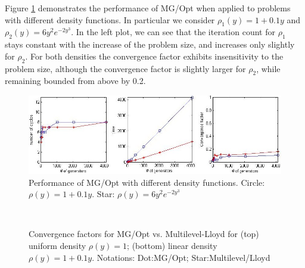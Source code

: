 \documentclass{siamltex}
\begin{document}
Figure \ref{fig:g_difnon} demonstrates the performance of MG/Opt when applied to problems with different density functions.  In particular we consider $\rho_1(y)=1+0.1y$ and $\rho_2(y)=6y^{2}e^{-2y^{3}}$.  In the left plot, we can see that the iteration count for $\rho_1$ stays constant with the increase of the problem size, and increases only slightly for $\rho_2$.  For both densities the convergence factor exhibits insensitivity to the problem size, although the convergence factor is slightly larger for $\rho_2$, while remaining bounded from above by 0.2.


\begin{figure}[h]
\centering
  \includegraphics[width=1.0\textwidth]{diff_nonlgt}
  \caption{Performance of MG/Opt with different density functions.  Circle: $\rho(y) = 1+0.1y$.
    Star: $\rho(y) = 6y^{2} e^{-2y^{3}}$}
\label{fig:g_difnon}
\end{figure}

\begin{figure}[h]
\centering
  \\
  \caption{Convergence factors for MG/Opt vs. Multilevel-Lloyd \cite{DE08} for (top)  uniform density $\rho(y) = 1$; (bottom)  linear density $\rho(y) = 1+0.1y$. Notations: Dot:MG/Opt; Star:Multilevel/Lloyd }
\label{fig:uni_ML}
\end{figure}
\end{document}
